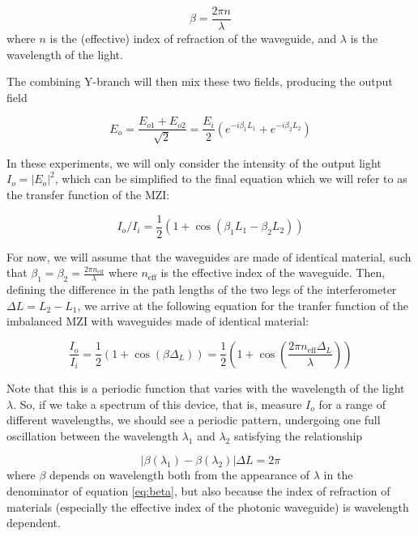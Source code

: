 \documentclass[journal]{IEEEtran}
\begin{document}
\begin{equation}
\beta = \frac{2\pi n}{\lambda}
\label{eq:beta}
\end{equation}
where $n$ is the (effective) index of refraction of the waveguide, and $\lambda$ is the wavelength of the light.

The combining Y-branch will then mix these two fields, producing the output field 

\begin{equation}
E_o = \frac{E_{o1} + E_{o2}}{\sqrt{2}} = \frac{E_i}{2} \left(e^{-i \beta_1 L_1} + e^{-i \beta_2 L_2} \right)
\end{equation}

In these experiments, we will only consider the intensity of the output light $I_o = |E_o|^2$, which can be simplified to the final equation which we will refer to as the transfer function of the MZI:

\begin{equation}
I_o/I_i = \frac{1}{2} (1 + \cos{(\beta_1 L_1 - \beta_2 L_2)})
\label{eq:trans_full}
\end{equation}

For now, we will assume that the waveguides are made of identical material, such that $\beta_1 = \beta_2 = \frac{2 \pi n_{\text{eff}}}{\lambda}$ where $n_{\text{eff}}$ is the effective index of the waveguide. Then, defining the difference in the path lengths of the two legs of the interferometer $\Delta L = L_2 - L_1$, we arrive at the following equation for the tranfer function of the imbalanced MZI with waveguides made of identical material:

\begin{equation}
\frac{I_o}{I_i} = \frac{1}{2} \left(1 + \cos{(\beta \Delta_L)}\right) = \frac{1}{2} \left(1 + \cos{\left(\frac{2\pi n_{\text{eff}} \Delta_L}{\lambda}\right)}\right)
\label{eq:trans_simple}
\end{equation}

Note that this is a periodic function that varies with the wavelength of the light $\lambda$. So, if we take a spectrum of this device, that is, measure $I_o$ for a range of different wavelengths, we should see a periodic pattern, undergoing one full oscillation between the wavelength $\lambda_1$ and $\lambda_2$ satisfying the relationship 

\begin{equation}
|\beta(\lambda_1) - \beta(\lambda_2)| \Delta L = 2 \pi
\label{eq:FSR_cond}
\end{equation}
where $\beta$ depends on wavelength both from the appearance of $\lambda$ in the denominator of equation \ref{eq:beta}, but also because the index of refraction of materials (especially the effective index of the photonic waveguide) is wavelength dependent.  
\end{document}
